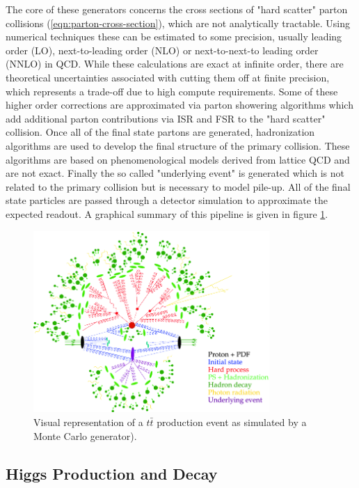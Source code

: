 The core of these generators concerns the cross sections of "hard scatter" parton collisions 
(\ref{eqn:parton-cross-section}), which are not analytically tractable. Using numerical techniques these can be 
estimated to some precision, usually leading order (LO), next-to-leading order (NLO) or next-to-next-to leading 
order (NNLO) in QCD. While these calculations are exact at infinite order, there are theoretical uncertainties 
associated with cutting them off at finite precision, which represents a trade-off due to high compute 
requirements. Some of these higher order corrections are approximated via parton showering algorithms which 
add additional parton contributions via ISR and FSR to the "hard scatter" collision. Once all of the final state 
partons are generated, hadronization algorithms are used to develop the final structure of the primary collision. 
These algorithms are based on phenomenological models derived from lattice QCD and are not exact. Finally 
the so called "underlying event" is generated which is not related to the primary collision but is necessary to 
model pile-up. All of the final state particles are passed through a detector simulation to approximate the 
expected readout. A graphical summary of this pipeline is given in figure \ref{fig:Monte_Carlo}.

\begin{figure}
\centering
    \includegraphics[width=0.8\textwidth]{images/Monte_Carlo.png}
    \caption{Visual representation of a $t\bar{t}$ production event as simulated by a Monte Carlo generator).}
    \label{fig:Monte_Carlo}
\end{figure}

\subsection{Higgs Production and Decay}

